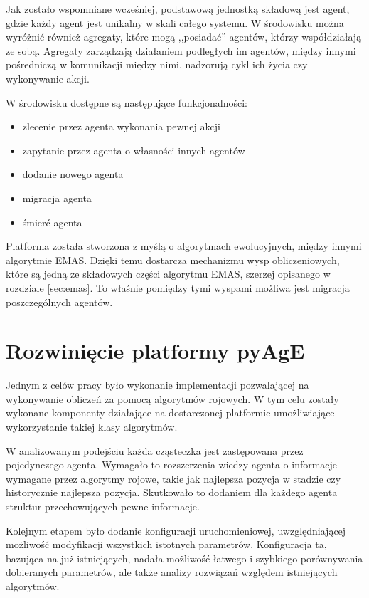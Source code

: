 Jak zostało wspomniane wcześniej, podstawową jednostką składową jest agent, gdzie każdy agent jest unikalny w skali całego systemu. W środowisku można wyróżnić również agregaty, które mogą ,,posiadać'' agentów, którzy współdziałają ze sobą. Agregaty zarządzają działaniem podległych im agentów, między innymi pośredniczą w komunikacji między nimi, nadzorują cykl ich życia czy wykonywanie akcji.

W środowisku dostępne są następujące funkcjonalności:
\begin{itemize}
\item zlecenie przez agenta wykonania pewnej akcji
\item zapytanie przez agenta o własności innych agentów
\item dodanie nowego agenta
\item migracja agenta
\item śmierć agenta
\end{itemize}

Platforma została stworzona z myślą o algorytmach ewolucyjnych, między innymi algorytmie EMAS. Dzięki temu dostarcza mechanizmu wysp obliczeniowych, które są jedną ze składowych części algorytmu EMAS, szerzej opisanego w rozdziale \ref{sec:emas}. To właśnie pomiędzy tymi wyspami możliwa jest migracja poszczególnych agentów.

\section{Rozwinięcie platformy pyAgE}

Jednym z celów pracy było wykonanie implementacji pozwalającej na wykonywanie obliczeń za pomocą algorytmów rojowych. W tym celu zostały wykonane komponenty działające na dostarczonej platformie umożliwiające wykorzystanie takiej klasy algorytmów. 

W analizowanym podejściu każda cząsteczka jest zastępowana przez pojedynczego agenta. Wymagało to rozszerzenia wiedzy agenta o informacje wymagane przez algorytmy rojowe, takie jak najlepsza pozycja w stadzie czy historycznie najlepsza pozycja. Skutkowało to dodaniem dla każdego agenta struktur przechowujących pewne informacje.

Kolejnym etapem było dodanie konfiguracji uruchomieniowej, uwzględniającej możliwość modyfikacji wszystkich istotnych parametrów. Konfiguracja ta, bazująca na już istniejących, nadała możliwość łatwego i szybkiego porównywania dobieranych parametrów, ale także analizy rozwiązań względem istniejących algorytmów.
